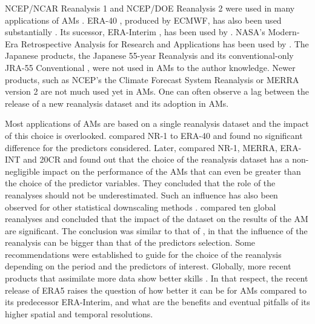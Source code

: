\documentclass[alpha-refs]{wiley-article}
\begin{document}
NCEP/NCAR Reanalysis 1 \citep[NR-1 --][]{Kalnay1996, Kistler2001} and NCEP/DOE Reanalysis 2 \citep[NR-2 --][]{Kanamitsu2002} were used in many applications of AMs \citep{Timbal2003, Bontron2004, Wetterhall2005a, Gangopadhyay2005, Altava-Ortiz2006, Barrera2007, Cannon2007, Matulla2007, Bliefernicht2007, Maurer2008, BenDaoud2009, Wu2012, Marty2012, Teng2012, Horton2012, Yiou2014}. ERA-40 \citep{Uppala2005}, produced by ECMWF, has also been used substantially \citep {BenDaoud2009, Willems2011b, JakobThemessl2011a, BenDaoud2011, Turco2011a, Franke2011, Pascual2012b, Schenk2012, Ribalaygua2013a, Osca2013, Radanovics2013, Martin2014b, Chardon2014, BenDaoud2016}. Its sucessor, ERA-Interim \citep[ERA-INT --][]{Dee2011a}, has been used by \cite{Raynaud2016b}. NASA's Modern-Era Retrospective Analysis for Research and Applications \citep[MERRA -- ][]{Rienecker2011} has been used by \citet{Vanvyve2015}. The Japanese products, the Japanese 55-year Reanalysis \citep[JRA-55 --][]{Kobayashi2015, Harada2016} and its conventional-only JRA-55 Conventional \citep[JRA-55C --][]{Kobayashi2014}, were not used in AMs to the author knowledge. Newer products, such as NCEP's the Climate Forecast System Reanalysis \citep[CFSR --][]{Saha2010a} or MERRA version 2 \citep[MERRA-2 -- ][]{Gelaro2017} are not much used yet in AMs. One can often observe a lag between the release of a new reanalysis dataset and its adoption in AMs.

Most applications of AMs are based on a single reanalysis dataset and the impact of this choice is overlooked. \citet{BenDaoud2009} compared NR-1 to ERA-40 and found no significant difference for the predictors considered. Later, \citet{Dayon2015} compared NR-1, MERRA, ERA-INT and 20CR and found out that the choice of the reanalysis dataset has a non-negligible impact on the performance of the AMs that can even be greater than the choice of the predictor variables. They concluded that the role of the reanalyses should not be underestimated. Such an influence has also been observed for other statistical downscaling methods \citep[e.g.][]{Koukidis2009}. \citet{Horton2018b} compared ten global reanalyses and concluded that the impact of the dataset on the results of the AM are significant. The conclusion was similar to that of \citet{Dayon2015}, in that the influence of the reanalysis can be bigger than that of the predictors selection. Some recommendations were established to guide for the choice of the reanalysis depending on the period and the predictors of interest. Globally, more recent products that assimilate more data show better skills \citep{Horton2018b}. In that respect, the recent release of ERA5 \citep{Hersbach2019} raises the question of how better it can be for AMs compared to its predecessor ERA-Interim, and what are the benefits and eventual pitfalls of its higher spatial and temporal resolutions.
\end{document}
